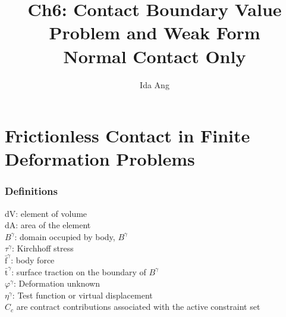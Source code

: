 \documentclass[12pt,3p]{article}
\numberwithin{equation}{section}
\begin{document}
\title{Ch6: Contact Boundary Value Problem and Weak Form \\
	\large{Normal Contact Only}}
\author{Ida Ang}
\date{\vspace{-5ex}}
\maketitle

\tableofcontents
\newpage

\section{Frictionless Contact in Finite Deformation Problems}
\subsubsection{Definitions}
dV: element of volume \\
dA: area of the element \\
$B^\gamma$: domain occupied by body, $B^\gamma$ \\
$\tau^\gamma$: Kirchhoff stress \\
$\bar{\text{f}}^\gamma$: body force \\
$\bar{\text{t}}^\gamma$: surface traction on the boundary of $B^\gamma$ \\
$\varphi^\gamma$: Deformation unknown \\
$\eta^\gamma$: Test function or virtual displacement \\
$C_c$ are contract contributions associated with the active constraint set 
\end{document}
